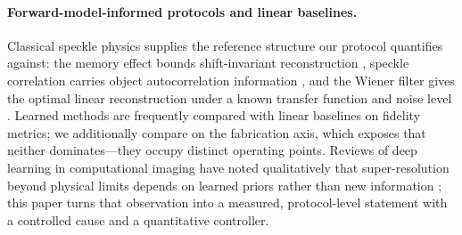 \paragraph{Forward-model-informed protocols and linear baselines.}
Classical speckle physics supplies the reference structure our protocol quantifies against: the memory effect bounds shift-invariant reconstruction \cite{freund1988memory}, speckle correlation carries object autocorrelation information \cite{katz2014noninvasive}, and the Wiener filter gives the optimal linear reconstruction under a known transfer function and noise level \cite{wiener1949extrapolation}. Learned methods are frequently compared with linear baselines on fidelity metrics; we additionally compare on the fabrication axis, which exposes that neither dominates---they occupy distinct operating points. Reviews of deep learning in computational imaging have noted qualitatively that super-resolution beyond physical limits depends on learned priors rather than new information \cite{barbastathis2019use}; this paper turns that observation into a measured, protocol-level statement with a controlled cause and a quantitative controller.
